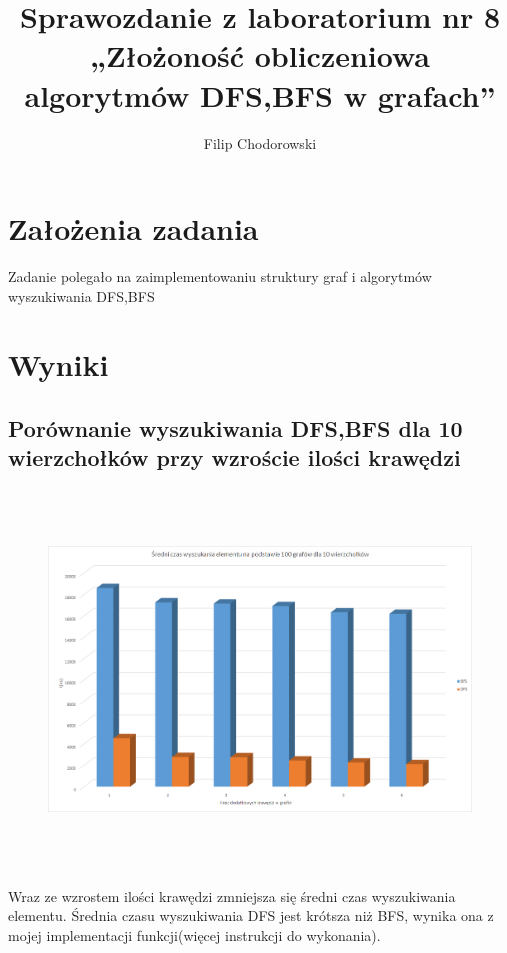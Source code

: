 \documentclass[a4paper,11pt]{article}
\author{Filip Chodorowski}
\title{Sprawozdanie z laboratorium nr 8\\
„Złożoność obliczeniowa algorytmów DFS,BFS w grafach”}
\begin{document}
\maketitle
\tableofcontents
\section{Założenia zadania}
Zadanie polegało na zaimplementowaniu struktury graf i algorytmów wyszukiwania DFS,BFS
\newpage
\section{Wyniki}
\subsection{Porównanie wyszukiwania DFS,BFS dla 10 wierzchołków przy wzroście ilości krawędzi}
\begin{center}
\begin{figure}[h!]
\includegraphics[width=12.5cm,height=10cm]{Wykresy2/10Wierzcholkow}
\label{fig:obrazek Wykresy2/DodawanieElementow}
\end{figure}
\end{center}
Wraz ze wzrostem ilości krawędzi zmniejsza się średni czas wyszukiwania elementu. Średnia czasu wyszukiwania DFS jest krótsza niż BFS, wynika ona z mojej implementacji funkcji(więcej instrukcji do wykonania).
\newpage
\end{document}

